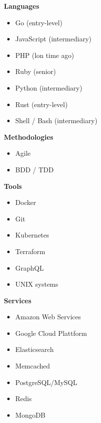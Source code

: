 \documentclass[9pt]{template} %
\begin{document}
\begin{minipage}[t]{0.3\textwidth} %
  \vspace{-\baselineskip}

  \textbf{Languages}
  \begin{itemize}
      \item Go {\footnotesize (entry-level)}
      \item JavaScript {\footnotesize (intermediary)}
      \item PHP {\footnotesize (lon  time ago)}
      \item Ruby {\footnotesize  (senior)}
      \item Python {\footnotesize  (intermediary)}
      \item Rust {\footnotesize (entry-level)}
      \item Shell / Bash {\footnotesize (intermediary)}
  \end{itemize}
\end{minipage}
\hfill
\begin{minipage}[t]{0.3\textwidth}
  \vspace{-\baselineskip}

  \textbf{Methodologies}
  \begin{itemize}
      \item Agile
      \item BDD / TDD
  \end{itemize}

  \textbf{Tools}
  \begin{itemize}
      \item Docker
      \item Git
      \item Kubernetes
      \item Terraform
      \item GraphQL
      \item UNIX systems
  \end{itemize}
\end{minipage}
\hfill
\begin{minipage}[t]{0.3\textwidth}
  \vspace{-\baselineskip}

  \textbf{Services}
  \begin{itemize}
      \item Amazon Web Services
      \item Google Cloud Plattform
      \item Elasticsearch
      \item Memcached
      \item PostgreSQL/MySQL
      \item Redis
      \item MongoDB
  \end{itemize}
\end{minipage}
\end{document}

